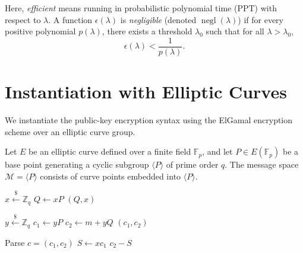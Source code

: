 Here, \emph{efficient} means running in probabilistic polynomial time (PPT) with respect to \(\lambda\).
A function \(\epsilon(\lambda)\) is \emph{negligible} (denoted \(\operatorname{negl}(\lambda)\)) if for every positive polynomial \(p(\lambda)\), there exists a threshold \(\lambda_0\) such that for all \(\lambda > \lambda_0\),
\[
    \epsilon(\lambda) < \frac{1}{p(\lambda)}.
\]

\section*{Instantiation with Elliptic Curves}

We instantiate the public-key encryption syntax using the ElGamal encryption scheme over an elliptic curve group.

\begin{definition}\label{def:ec-elgamal-pke}
Let \(E\) be an elliptic curve defined over a finite field \(\mathbb{F}_p\), and let \(P \in E(\mathbb{F}_p)\) be a base point generating a cyclic subgroup \(\langle P \rangle\) of prime order \(q\).
The message space \(\mathcal{M} = \langle P \rangle\) consists of curve points embedded into \(\langle P \rangle\).

\noindent
\begin{minipage}[t]{0.30\linewidth}%
\begin{algorithmic}[1]
        \State \(x \xleftarrow{\$} \mathbb{Z}_q\)
        \State \(Q \gets xP\)
        \State \Return \((Q, x)\)
    \EndProcedure
\end{algorithmic}%
\end{minipage}\hfill
\begin{minipage}[t]{0.36\linewidth}%
\begin{algorithmic}[1]
        \State \(y \xleftarrow{\$} \mathbb{Z}_q\)
        \State \(c_1 \gets yP\)
        \State \(c_2 \gets m + yQ\)
        \State \Return \((c_1, c_2)\)
    \EndProcedure
\end{algorithmic}%
\end{minipage}\hfill
\begin{minipage}[t]{0.32\linewidth}%
\begin{algorithmic}[1]
        \State Parse \(c = (c_1, c_2)\)
        \State \(S \gets x c_1\)
        \State \Return \(c_2 - S\)
    \EndProcedure
\end{algorithmic}%
\end{minipage}%
\end{definition}

